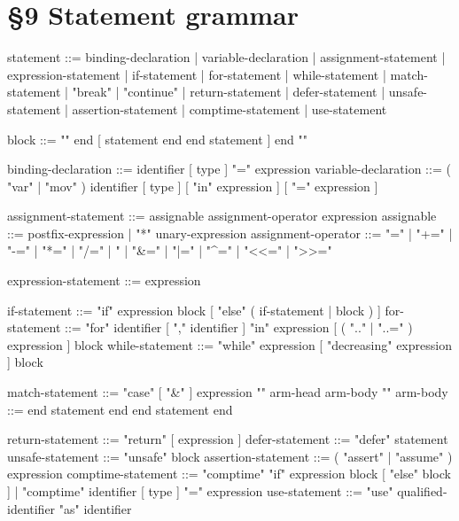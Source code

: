 \section*{§9 Statement grammar}
\label{gram:statement}
\begin{grammar}
statement            ::=
    binding-declaration
  | variable-declaration
  | assignment-statement
  | expression-statement
  | if-statement
  | for-statement
  | while-statement
  | match-statement
  | "break"
  | "continue"
  | return-statement
  | defer-statement
  | unsafe-statement
  | assertion-statement
  | comptime-statement
  | use-statement

block                ::= "{" { end } [ statement { end { end } statement } ] { end } "}"


binding-declaration  ::= identifier [ type ] "=" expression             %
variable-declaration ::= ( "var" | "mov" ) identifier [ type ]
                         [ "in" expression ] [ "=" expression ]

assignment-statement ::= assignable assignment-operator expression
assignable           ::= postfix-expression | "*" unary-expression
assignment-operator  ::= "=" | "+=" | "-=" | "*=" | "/=" | "%
                       | "&=" | "|=" | "^=" | "<<=" | ">>="

expression-statement ::= expression

if-statement         ::= "if" expression block [ "else" ( if-statement | block ) ]
for-statement        ::= "for" identifier [ "," identifier ] "in"
                         expression [ ( ".." | "..=" ) expression ] block
while-statement      ::= "while" expression [ "decreasing" expression ] block

match-statement      ::= "case" [ "&" ] expression "{" { arm-head arm-body } "}"
arm-body             ::= { end } statement end { { end } statement end }

return-statement     ::= "return" [ expression ]
defer-statement      ::= "defer" statement               %
unsafe-statement     ::= "unsafe" block
assertion-statement  ::= ( "assert" | "assume" ) expression
comptime-statement   ::= "comptime" "if" expression block [ "else" block ]
                       | "comptime" identifier [ type ] "=" expression
use-statement        ::= "use" qualified-identifier "as" identifier
\end{grammar}


